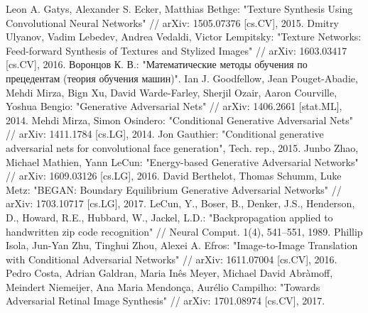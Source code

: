 \documentclass[a4paper]{article}
\begin{document}
	
	\setcounter{page}{2}
	\tableofcontents
	
	
	
	
	
	
	
	
	
	
	\begin{thebibliography}{99}
		 Leon A. Gatys, Alexander S. Ecker, Matthias Bethge: "Texture Synthesis Using Convolutional Neural Networks" // arXiv: 1505.07376 [cs.CV], 2015.
		 Dmitry Ulyanov, Vadim Lebedev, Andrea Vedaldi, Victor Lempitsky: "Texture Networks: Feed-forward Synthesis of Textures and Stylized Images" // arXiv: 1603.03417 [cs.CV], 2016.
		  Воронцов К. В.: "Математические методы обучения по прецедентам (теория обучения машин)".
		 Ian J. Goodfellow, Jean Pouget-Abadie, Mehdi Mirza, Bign Xu, David Warde-Farley, Sherjil Ozair, Aaron Courville, Yoshua Bengio: "Generative Adversarial Nets" // arXiv: 1406.2661 [stat.ML], 2014.
		 Mehdi Mirza, Simon Osindero: "Conditional Generative Adversarial Nets" // arXiv: 1411.1784 [cs.LG], 2014.
		 Jon Gauthier: "Conditional generative adversarial nets for convolutional face generation", Tech. rep., 2015.
		 Junbo Zhao, Michael Mathien, Yann LeCun: "Energy-based Generative Adversarial Networks" // arXiv: 1609.03126 [cs.LG], 2016.
		 David Berthelot, Thomas Schumm, Luke Metz: "BEGAN: Boundary Equilibrium Generative Adversarial Networks" // arXiv: 1703.10717 [cs.LG], 2017.
		 LeCun, Y., Boser, B., Denker, J.S., Henderson, D., Howard, R.E., Hubbard, W., Jackel, L.D.: "Backpropagation applied to handwritten zip code recognition" // Neural Comput. 1(4), 541–551, 1989.
		 Phillip Isola, Jun-Yan Zhu, Tinghui Zhou, Alexei A. Efros: "Image-to-Image Translation with Conditional Adversarial Networks" // arXiv: 1611.07004 [cs.CV], 2016.
		 Pedro Costa, Adrian Galdran, Maria Inês Meyer, Michael David Abràmoff, Meindert Niemeijer, Ana Maria Mendonça, Aurélio Campilho: "Towards Adversarial Retinal Image Synthesis" // arXiv: 1701.08974 [cs.CV], 2017.

\end{thebibliography}
\end{document}
